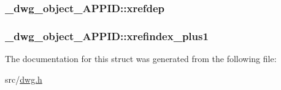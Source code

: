 \hypertarget{struct__dwg__object__APPID_a160b1701472989f7926855a40140539a}{
\subsubsection[{xrefdep}]{ {\bf \-\_\-dwg\-\_\-object\-\_\-\-A\-P\-P\-I\-D\-::xrefdep}}}\label{struct__dwg__object__APPID_a160b1701472989f7926855a40140539a}
\hypertarget{struct__dwg__object__APPID_a5c0788e6875df8ed3ba5afaef1329c53}{
\subsubsection[{xrefindex\-\_\-plus1}]{ {\bf \-\_\-dwg\-\_\-object\-\_\-\-A\-P\-P\-I\-D\-::xrefindex\-\_\-plus1}}}\label{struct__dwg__object__APPID_a5c0788e6875df8ed3ba5afaef1329c53}


\-The documentation for this struct was generated from the following file\-:\begin{DoxyCompactItemize}
\item 
src/\hyperlink{dwg_8h}{dwg.\-h}\end{DoxyCompactItemize}
